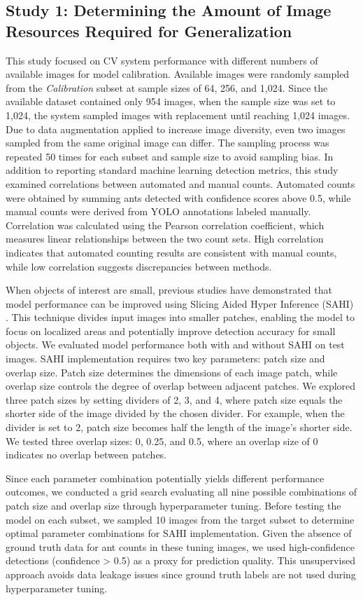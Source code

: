 \subsection{Study 1: Determining the Amount of Image Resources Required for Generalization}

This study focused on CV system performance with different numbers of available images for model calibration. Available images were randomly sampled from the \textit{Calibration} subset at sample sizes of 64, 256, and 1,024. Since the available dataset contained only 954 images, when the sample size was set to 1,024, the system sampled images with replacement until reaching 1,024 images. Due to data augmentation applied to increase image diversity, even two images sampled from the same original image can differ. The sampling process was repeated 50 times for each subset and sample size to avoid sampling bias. In addition to reporting standard machine learning detection metrics, this study examined correlations between automated and manual counts. Automated counts were obtained by summing ants detected with confidence scores above 0.5, while manual counts were derived from YOLO annotations labeled manually. Correlation was calculated using the Pearson correlation coefficient, which measures linear relationships between the two count sets. High correlation indicates that automated counting results are consistent with manual counts, while low correlation suggests discrepancies between methods.

When objects of interest are small, previous studies have demonstrated that model performance can be improved using Slicing Aided Hyper Inference (SAHI) \cite{akyon_slicing_2022}. This technique divides input images into smaller patches, enabling the model to focus on localized areas and potentially improve detection accuracy for small objects. We evaluated model performance both with and without SAHI on test images. SAHI implementation requires two key parameters: patch size and overlap size. Patch size determines the dimensions of each image patch, while overlap size controls the degree of overlap between adjacent patches. We explored three patch sizes by setting dividers of 2, 3, and 4, where patch size equals the shorter side of the image divided by the chosen divider. For example, when the divider is set to 2, patch size becomes half the length of the image's shorter side. We tested three overlap sizes: 0, 0.25, and 0.5, where an overlap size of 0 indicates no overlap between patches.

Since each parameter combination potentially yields different performance outcomes, we conducted a grid search evaluating all nine possible combinations of patch size and overlap size through hyperparameter tuning. Before testing the model on each subset, we sampled 10 images from the target subset to determine optimal parameter combinations for SAHI implementation. Given the absence of ground truth data for ant counts in these tuning images, we used high-confidence detections (confidence > 0.5) as a proxy for prediction quality. This unsupervised approach avoids data leakage issues since ground truth labels are not used during hyperparameter tuning.

